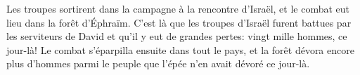 Les troupes sortirent dans la campagne à la rencontre d’Israël,
	et le combat eut lieu dans la forêt d’Éphraïm.
C’est là que les troupes d’Israël furent battues par les serviteurs de David
	et qu’il y eut de grandes pertes: vingt mille hommes, ce jour-là!
Le combat s’éparpilla ensuite dans tout le pays,
	et la forêt dévora encore plus d’hommes parmi le peuple
	que l’épée n’en avait dévoré ce jour-là.

